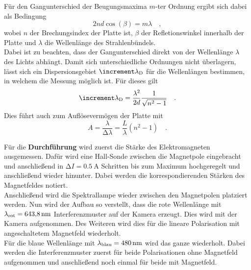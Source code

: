 \noindent
Für den Gangunterschied der Beugungsmaxima $m$-ter Ordnung ergibt sich dabei als Bedingung
\begin{equation}
    2nd \cos (\beta) = m \lambda \quad ,
    \label{eqn:platte}
\end{equation}
wobei $n$ der Brechungsindex der Platte ist, $\beta$ der Refletionswinkel innerhalb der Platte und $\lambda$ die Wellenlänge des Strahlenbündels.\\
Dabei ist zu beachten, dass der Gangunterschied direkt von der Wellenlänge $\lambda$ des Lichts abhängt.
Damit sich unterschiedliche Ordnungen nicht überlagern, lässt sich ein Dispersionsgebiet $\increment \lambda_\t{D}$ für die Wellenlängen bestimmen, 
in welchem die Messung möglich ist.
Für dieses gilt
\begin{equation}
    \increment \lambda_\t{D} = \frac{\lambda^2}{2d}\frac{1}{\sqrt{n^2 -1}} \quad .
\end{equation} 
Dies führt auch zum Auflösevermögen der Platte mit 
\begin{equation*}
    A = \frac{\lambda}{\increment \lambda} = \frac{L}{\lambda} (n^2 -1) \quad .
\end{equation*}


\noindent
Für die \textbf{Durchführung} wird zuerst die Stärke des Elektromagneten ausgemessen. 
Dafür wird eine Hall-Sonde zwischen die Magnetpole eingebracht und anschließend in $\increment I = \SI{0.5}{\ampere}$ 
Schritten bis zum Maximum hochgeregelt und anschließend wieder hinunter. Dabei werden die korrespondierenden Stärken des Magnetfeldes notiert.\\
Anschließend wird die Spektrallampe wieder zwischen den Magnetpolen platziert werden.
Nun wird der Aufbau so verstellt, dass die rote Wellenlänge mit $\lambda_{\text{rot}} = \SI{643.8}{\nano\metre}$ \cite{V27} Interferenzmuster auf der Kamera erzeugt.
Dies wird mit der Kamera aufgenommen. Des Weiteren wird dies für die lineare Polarisation mit angeschaltetem Magnetfeld wiederholt.\\
Für die blaue Wellenlänge mit $\lambda_{\text{blau}} = \SI{480}{\nano\metre}$ \cite{V27} wird das ganze wiederholt. 
Dabei werden die Interferenzmuster zuerst für beide Polarisationen ohne Magnetfeld aufgenommen und anschließend noch einmal für beide mit Magnetfeld.